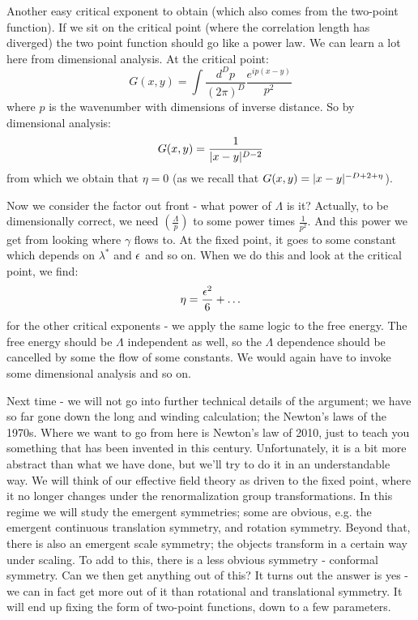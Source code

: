 Another easy critical exponent to obtain (which also comes from the two-point function). If we sit on the critical point (where the correlation length has diverged) the two point function should go like a power law. We can learn a lot here from dimensional analysis. At the critical point:
\begin{equation}
    G(x, y) = \int \frac{d^Dp}{(2\pi)^D} \frac{e^{ip(x-y)}}{p^2}
\end{equation}
where $p$ is the wavenumber with dimensions of inverse distance. So by dimensional analysis:
\begin{equation}
    G(x, y) = \frac{1}{\lvert x-y \rvert^{D-2}}
\end{equation}
from which we obtain that $\eta = 0$ (as we recall that $G(x, y) = \lvert x-y \rvert^{-D + 2 + \eta}$).

Now we consider the factor out front - what power of $\Lambda$ is it? Actually, to be dimensionally correct, we need $\left(\frac{\Lambda}{p}\right)$ to some power times $\frac{1}{p^2}$. And this power we get from looking where $\gamma$ flows to. At the fixed point, it goes to some constant which depends on $\lambda^*$ and $\epsilon$ and so on. When we do this and look at the critical point, we find:
\begin{equation}
    \eta = \frac{\epsilon^2}{6} + \ldots 
\end{equation}
for the other critical exponents - we apply the same logic to the free energy. The free energy should be $\Lambda$ independent as well, so the $\Lambda$ dependence should be cancelled by some the flow of some constants. We would again have to invoke some dimensional analysis and so on.

Next time - we will not go into further technical details of the argument; we have so far gone down the long and winding calculation; the Newton's laws of the 1970s. Where we want to go from here is Newton's law of 2010, just to teach you something that has been invented in this century. Unfortunately, it is a bit more abstract than what we have done, but we'll try to do it in an understandable way. We will think of our effective field theory as driven to the fixed point, where it no longer changes under the renormalization group transformations. In this regime we will study the emergent symmetries; some are obvious, e.g. the emergent continuous translation symmetry, and rotation symmetry. Beyond that, there is also an emergent scale symmetry; the objects transform in a certain way under scaling. To add to this, there is a less obvious symmetry - conformal symmetry. Can we then get anything out of this? It turns out the answer is yes - we can in fact get more out of it than rotational and translational symmetry. It will end up fixing the form of two-point functions, down to a few parameters.